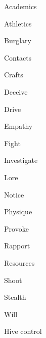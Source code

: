 \begin{npcBox}[title=Stef a Norm investigator]

    \begin{aspects}
    \item {}
    \item {}
    \item \aspect[Aspect]{}    
    \end{aspects}
    
    \begin{skills}
        \item {} Academics
        \item {} Athletics
        \item {} Burglary
        \item {} Contacts
        \item {} Crafts
        \item {} Deceive
        \item {} Drive
        \item {} Empathy
        \item {} Fight
        \item {} Investigate
        \item {} Lore
        \item {} Notice
        \item {} Physique
        \item {} Provoke
        \item {} Rapport
        \item {} Resources
        \item {} Shoot
        \item {} Stealth
        \item {} Will
        \item {} Hive control
     \end{skills}
    
    \begin{stunts}
    \item {}
    \end{stunts}
    
    \begin{stressSection}
    \end{stressSection}
    \begin{tabularx}{\textwidth}{ XX }
    \end{tabularx}
    

\end{npcBox}
